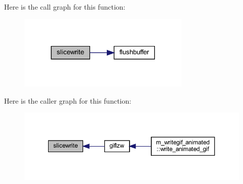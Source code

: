 Here is the call graph for this function\+:
\nopagebreak
\begin{figure}[H]
\begin{center}
\leavevmode
\includegraphics[width=233pt]{M__writegif__animated_8f90_ac5c0245eea61f109cbf3ce5bbf38981b_cgraph}
\end{center}
\end{figure}
Here is the caller graph for this function\+:
\nopagebreak
\begin{figure}[H]
\begin{center}
\leavevmode
\includegraphics[width=350pt]{M__writegif__animated_8f90_ac5c0245eea61f109cbf3ce5bbf38981b_icgraph}
\end{center}
\end{figure}
